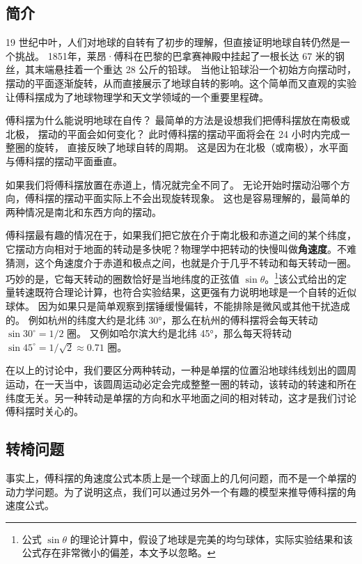 
\begin{issues}
\end{issues}

\subsection{简介}
19 世纪中叶，人们对地球的自转有了初步的理解，但直接证明地球自转仍然是一个挑战。 1851年，莱昂·傅科在巴黎的巴拿赛神殿中挂起了一根长达 67 米的钢丝，其末端悬挂着一个重达 28 公斤的铅球。 当他让铅球沿一个初始方向摆动时，摆动的平面逐渐旋转，从而直接展示了地球自转的影响。这个简单而又直观的实验让傅科摆成为了地球物理学和天文学领域的一个重要里程碑。

傅科摆为什么能说明地球在自传？ 最简单的方法是设想我们把傅科摆放在南极或北极， 摆动的平面会如何变化？ 此时傅科摆的摆动平面将会在 24 小时内完成一整圈的旋转， 直接反映了地球自转的周期。 这是因为在北极（或南极），水平面与傅科摆的摆动平面垂直。

如果我们将傅科摆放置在赤道上，情况就完全不同了。 无论开始时摆动沿哪个方向，傅科摆的摆动平面实际上不会出现旋转现象。 这也是容易理解的，最简单的两种情况是南北和东西方向的摆动。

傅科摆最有趣的情况在于，如果我们把它放在介于南北极和赤道之间的某个纬度，它摆动方向相对于地面的转动是多快呢？物理学中把转动的快慢叫做\textbf{角速度}。不难猜测，这个角速度介于赤道和极点之间，也就是介于几乎不转动和每天转动一圈。 巧妙的是，它每天转动的圈数恰好是当地纬度的正弦值 $\sin\theta$。\footnote{公式 $\sin\theta$ 的理论计算中，假设了地球是完美的均匀球体，实际实验结果和该公式存在非常微小的偏差，本文予以忽略。}该公式给出的定量转速既符合理论计算，也符合实验结果，这更强有力说明地球是一个自转的近似球体。 因为如果只是简单观察到摆锤缓慢偏转，不能排除是微风或其他干扰造成的。 例如杭州的纬度大约是北纬 30°，那么在杭州的傅科摆将会每天转动 $\sin 30^\circ = 1/2$ 圈。 又例如哈尔滨大约是北纬 45°，那么每天将转动 $\sin 45^\circ = 1/\sqrt{2}\approx 0.71$ 圈。

在以上的讨论中，我们要区分两种转动，一种是单摆的位置沿地球纬线划出的圆周运动，在一天当中，该圆周运动必定会完成整整一圈的转动，该转动的转速和所在纬度无关。另一种转动是单摆的方向和水平地面之间的相对转动，这才是我们讨论傅科摆时关心的。

\subsection{转椅问题}
事实上，傅科摆的角速度公式本质上是一个球面上的几何问题，而不是一个单摆的动力学问题。为了说明这点，我们可以通过另外一个有趣的模型来推导傅科摆的角速度公式。

